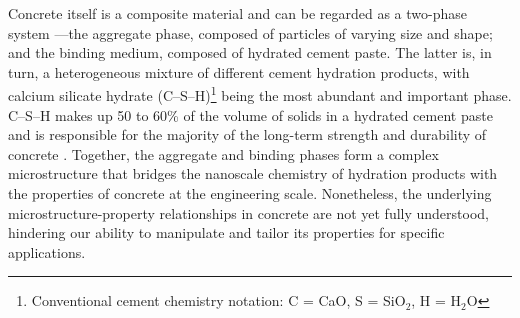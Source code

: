 Concrete itself is a composite material and can be regarded as a two-phase system \cite{mehta2014concrete}---the aggregate phase, composed of particles of varying size and shape; and the binding medium, composed of hydrated cement paste. The latter is, in turn, a heterogeneous mixture of different cement hydration products, with calcium silicate hydrate (C--S--H)\footnote{
Conventional cement chemistry notation: C = CaO, S = SiO$_2$, H = H$_2$O
} being the most abundant and important phase. C--S--H makes up 50 to 60\% of the volume of solids in a hydrated cement paste and is responsible for the majority of the long-term strength and durability of concrete \cite{mehta2014concrete}. Together, the aggregate and binding phases form a complex microstructure that bridges the nanoscale chemistry of hydration products with the properties of concrete at the engineering scale. Nonetheless, the underlying microstructure-property relationships in concrete are not yet fully understood, hindering our ability to manipulate and tailor its properties for specific applications. 


